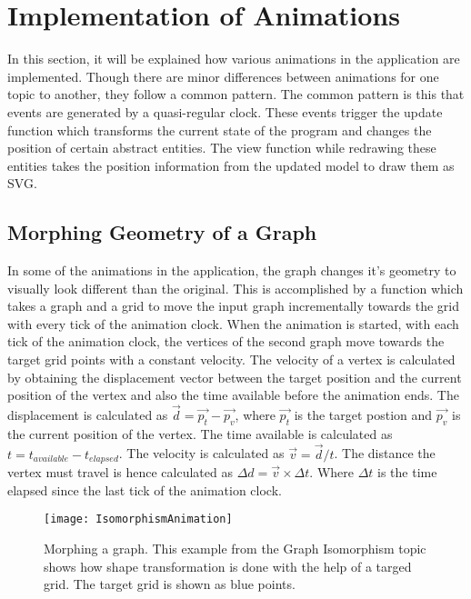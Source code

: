 \section{Implementation of Animations}
In this section, it will be explained how various animations in the
application are implemented. Though there are minor differences between animations
for one topic to another, they follow a common pattern. The common pattern is
this that events are generated by a quasi-regular clock. These events trigger
the update function which transforms the current state of the program and
changes the position of certain abstract entities. The view function while
redrawing these entities takes the position information from the updated model
to draw them as SVG.

\subsection{Morphing Geometry of a Graph}
\label{animation: morphing}
In some of the animations in the application, the graph changes it's geometry
to visually look different than the original. This is accomplished by a
function which takes a graph and a grid to move the input graph incrementally
towards the grid with every tick of the animation clock. 
When the animation
is started, with each tick of the animation clock, the vertices of the
second graph move towards the target grid points with a constant velocity.
The velocity of a vertex is calculated by obtaining the displacement vector between
the target position and the current position of the vertex and also the time
available before the animation ends.
The displacement is calculated as $\vec{d} = \vec{p_t} - \vec{p_v}$, where
$\vec{p_t}$ is the target postion and $\vec{p_v}$ is the current position of
the vertex. The time available is calculated as $t = t_{available} -
t_{elapsed}$. The velocity is calculated as $\vec{v} = \vec{d}/t$.  The
distance the vertex must travel is hence calculated as $\Delta d = \vec{v}
\times \Delta t$.  Where $\Delta t$ is the time elapsed since the last tick of
the animation clock.


\begin{figure}[h]
\centering
\texttt{[image: IsomorphismAnimation]}
\caption{
        Morphing a graph. This example from the Graph Isomorphism topic
        shows how shape transformation is done with the help of a targed grid.
        The target grid is shown as blue points.
        }
\label{animationfigure: isomorphism}
\end{figure}

